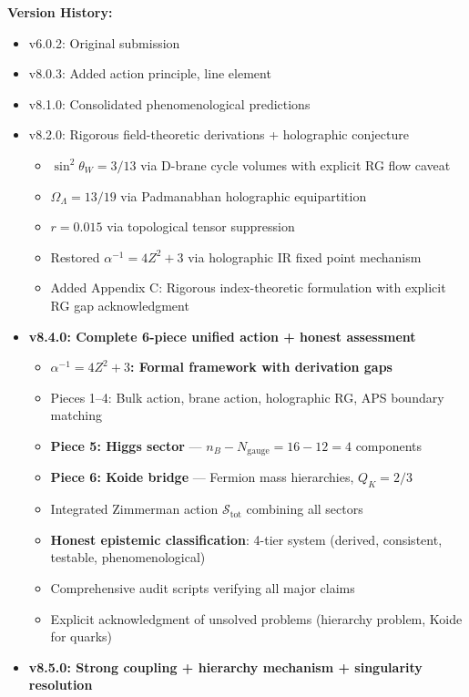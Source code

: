 \documentclass[12pt,a4paper]{article}
\newcommand{\OmegaL}{\Omega_\Lambda}
\newcommand{\sinW}{\sin^2\theta_W}
\newcommand{\Zsq}{Z^2}
\begin{document}
\textbf{Version History:}
\begin{itemize}[itemsep=0pt]
    \item v6.0.2: Original submission
    \item v8.0.3: Added action principle, line element
    \item v8.1.0: Consolidated phenomenological predictions
    \item v8.2.0: Rigorous field-theoretic derivations + holographic conjecture
    \begin{itemize}[itemsep=0pt]
        \item $\sinW = 3/13$ via D-brane cycle volumes with explicit RG flow caveat
        \item $\OmegaL = 13/19$ via Padmanabhan holographic equipartition
        \item $r = 0.015$ via topological tensor suppression
        \item Restored $\alpha^{-1} = 4\Zsq + 3$ via holographic IR fixed point mechanism
        \item Added Appendix C: Rigorous index-theoretic formulation with explicit RG gap acknowledgment
    \end{itemize}
    \item \textbf{v8.4.0: Complete 6-piece unified action + honest assessment}
    \begin{itemize}[itemsep=0pt]
        \item \textbf{$\alpha^{-1} = 4\Zsq + 3$: Formal framework with derivation gaps}
        \item Pieces 1--4: Bulk action, brane action, holographic RG, APS boundary matching
        \item \textbf{Piece 5: Higgs sector} --- $n_B - N_{\text{gauge}} = 16 - 12 = 4$ components
        \item \textbf{Piece 6: Koide bridge} --- Fermion mass hierarchies, $Q_K = 2/3$
        \item Integrated Zimmerman action $\mathcal{S}_{\text{tot}}$ combining all sectors
        \item \textbf{Honest epistemic classification}: 4-tier system (derived, consistent, testable, phenomenological)
        \item Comprehensive audit scripts verifying all major claims
        \item Explicit acknowledgment of unsolved problems (hierarchy problem, Koide for quarks)
    \end{itemize}
    \item \textbf{v8.5.0: Strong coupling + hierarchy mechanism + singularity resolution}

\end{itemize}
\end{document}
